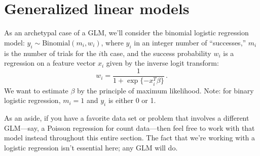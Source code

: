 \documentclass{article}
\begin{document}
\section{Generalized linear models}

As an archetypal case of a GLM, we'll consider the binomial logistic regression model: $y_i \sim \mbox{Binomial}(m_i, w_i)$, where $y_i$ in an integer number of ``successes,'' $m_i$ is the number of trials for the $i$th case, and the success probability $w_i$ is a regression on a feature vector $x_i$ given by the inverse logit transform:
$$
w_i = \frac{1}{1 + \exp\{-x_i^T \beta\}} \, .
$$
We want to estimate $\beta$ by the principle of maximum likelihood.  Note: for binary logistic regression, $m_i = 1$ and $y_i$ is either 0 or 1.

As an aside, if you have a favorite data set or problem that involves a different GLM---say, a Poisson regression for count data---then feel free to work with that model instead throughout this entire section.  The fact that we're working with a logistic regression isn't essential here; any GLM will do.
\end{document}
